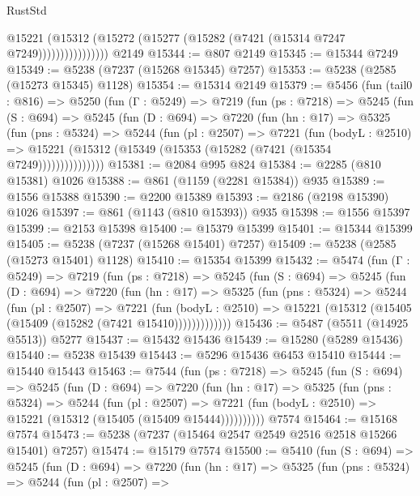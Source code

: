 \begin{lexlean}{RustStd}
\begin{coremodule}
                      @15221
                        (@15312 (@15272 (@15277 (@15282 (@7421 (@15314 @7247 @7249))))))))))))))))
    @2149
@15344 := @807 @2149
@15345 := @15344 @7249
@15349 := @5238 (@7237 (@15268 @15345) @7257)
@15353 := @5238 (@2585 (@15273 @15345) @1128)
@15354 := @15314 @2149
@15379 := @5456
    (fun (tail0 : @816) =>
    @5250
      (fun (Γ : @5249) =>
      @7219
        (fun (ps : @7218) =>
        @5245
          (fun (S : @694) =>
          @5245
            (fun (D : @694) =>
            @7220
              (fun (hn : @17) =>
              @5325
                (fun (pns : @5324) =>
                @5244
                  (fun (pl : @2507) =>
                  @7221
                    (fun (bodyL : @2510) =>
                    @15221 (@15312 (@15349 (@15353 (@15282 (@7421 (@15354 @7249)))))))))))))))
@15381 := @2084 @995 @824
@15384 := @2285 (@810 @15381) @1026
@15388 := @861 (@1159 (@2281 @15384)) @935
@15389 := @1556 @15388
@15390 := @2200 @15389
@15393 := @2186 (@2198 @15390) @1026
@15397 := @861 (@1143 (@810 @15393)) @935
@15398 := @1556 @15397
@15399 := @2153 @15398
@15400 := @15379 @15399
@15401 := @15344 @15399
@15405 := @5238 (@7237 (@15268 @15401) @7257)
@15409 := @5238 (@2585 (@15273 @15401) @1128)
@15410 := @15354 @15399
@15432 := @5474
    (fun (Γ : @5249) =>
    @7219
      (fun (ps : @7218) =>
      @5245
        (fun (S : @694) =>
        @5245
          (fun (D : @694) =>
          @7220
            (fun (hn : @17) =>
            @5325
              (fun (pns : @5324) =>
              @5244
                (fun (pl : @2507) =>
                @7221
                  (fun (bodyL : @2510) =>
                  @15221 (@15312 (@15405 (@15409 (@15282 (@7421 @15410)))))))))))))
@15436 := @5487 (@5511 (@14925 @5513)) @5277
@15437 := @15432 @15436
@15439 := @15280 (@5289 @15436)
@15440 := @5238 @15439
@15443 := @5296 @15436 @6453 @15410
@15444 := @15440 @15443
@15463 := @7544
    (fun (ps : @7218) =>
    @5245
      (fun (S : @694) =>
      @5245
        (fun (D : @694) =>
        @7220
          (fun (hn : @17) =>
          @5325
            (fun (pns : @5324) =>
            @5244
              (fun (pl : @2507) =>
              @7221 (fun (bodyL : @2510) => @15221 (@15312 (@15405 (@15409 @15444))))))))))
    @7574
@15464 := @15168 @7574
@15473 := @5238 (@7237 (@15464 @2547 @2549 @2516 @2518 @15266 @15401) @7257)
@15474 := @15179 @7574
@15500 := @5410
    (fun (S : @694) =>
    @5245
      (fun (D : @694) =>
      @7220
        (fun (hn : @17) =>
        @5325
          (fun (pns : @5324) =>
          @5244
            (fun (pl : @2507) =>

\end{coremodule}
\end{lexlean}
